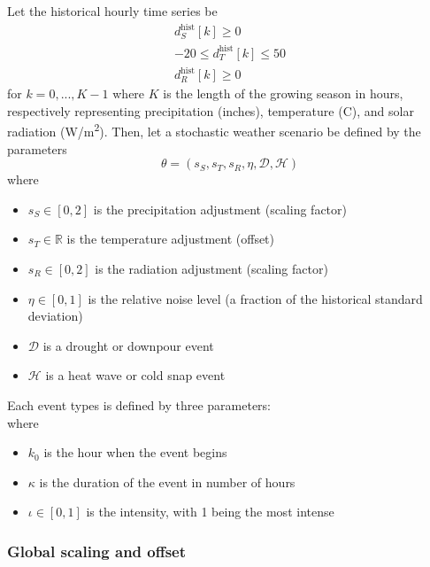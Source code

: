 \documentclass[preprint,12pt]{elsarticle}
\begin{document}
Let the historical hourly time series be
\begin{gather}
d_{S}^{\text{hist}}[k] \geq 0           \\
-20 \leq d_{T}^{\text{hist}}[k] \leq 50 \\
d_{R}^{\text{hist}}[k] \geq 0
\label{eqn:history}
\end{gather}
for $k=0,...,K-1$ where $K$ is the length of the growing season in hours, respectively representing precipitation (inches), temperature (\textdegree C), and solar radiation (W/m\textsuperscript{2}). Then, let a stochastic weather scenario be defined by the parameters
\begin{equation}
\theta = (s_{S}, s_{T}, s_{R}, \eta, \mathcal{D}, \mathcal{H})
\label{eqn:weather-scenario}
\end{equation}
where
\begin{itemize}
\item $s_{S} \in [0, 2]$ is the precipitation adjustment (scaling factor)
\item $s_{T} \in \mathbb{R}$ is the temperature adjustment (offset)
\item $s_{R} \in [0, 2]$ is the radiation adjustment (scaling factor)
\item $\eta \in [0, 1]$ is the relative noise level (a fraction of the historical standard deviation)
\item $\mathcal{D}$ is a drought or downpour event
\item $\mathcal{H}$ is a heat wave or cold snap event
\end{itemize}

Each event types is defined by three parameters:
\begin{equation}
[k_{0}, \kappa, \iota]
\label{eqn:event}
\end{equation}
where
\begin{itemize}
\item $k_{0}$ is the hour when the event begins
\item $\kappa$ is the duration of the event in number of hours
\item $\iota\in[0,1]$ is the intensity, with 1 being the most intense
\end{itemize}

\subsubsection{Global scaling and offset}\label{subsubsec:weather-step-1}
\end{document}
